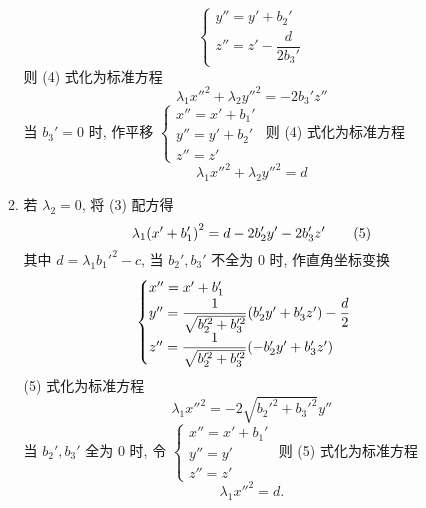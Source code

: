 \begin{enumerate}[label=(\arabic{*})]
\begin{enumerate}[label=(\roman{*})]
$$\begin{cases}
                            y''=y'+b_2' \\
                            z''=z'-\dfrac{d}{2b_3'}
                        \end{cases}$$ 则 (4) 式化为标准方程 $$\lambda_1x''^2+\lambda_2y''^2=-2b_3'z''$$
                    当 $b_3'=0$ 时, 作平移 $\begin{cases}
                            x''=x'+b_1' \\
                            y''=y'+b_2' \\
                            z''=z'
                        \end{cases}$ 则 (4) 式化为标准方程 $$\lambda_1x''^2+\lambda_2y''^2=d$$
              \item 若 $\lambda_2=0$, 将 (3) 配方得
                    \begin{equation*}
                        \lambda_1\qty(x'+b_1')^2=d-2b_2'y'-2b_3'z'
                        \tag{5}
                    \end{equation*}
                    其中 $d=\lambda_1b_1'^2-c$, 当 $b_2',b_3'$ 不全为 0 时, 作直角坐标变换
                    $$\begin{cases}
                            x''=x'+b_1'                                                         \\
                            y''=\dfrac{1}{\sqrt{b_2'^2+b_3'^2}}\qty(b_2'y'+b_3'z')-\dfrac{d}{2} \\[6pt]
                            z''=\dfrac{1}{\sqrt{b_2'^2+b_3'^2}}\qty(-b_2'y'+b_3'z')
                        \end{cases}$$
                    (5) 式化为标准方程 $$\lambda_1x''^2=-2\sqrt{b_2'^2+b_3'^2}y''$$
                    当 $b_2',b_3'$ 全为 0 时, 令 $\begin{cases}
                            x''=x'+b_1' \\
                            y''=y'      \\
                            z''=z'
                        \end{cases}$ 则 (5) 式化为标准方程 $$\lambda_1x''^2=d.$$
          \end{enumerate}
\end{enumerate}

